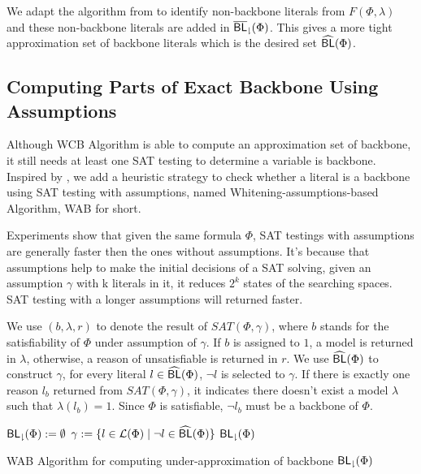 We adapt the algorithm from \cite{Jon75} to identify non-backbone literals from $F(\Phi,\lambda)$ and these non-backbone literals are added in ${\sf \overline{BL}_\downharpoonright}(\Phi)$.
This gives a more tight approximation set of backbone literals which is the desired set ${\sf \widehat{BL}}(\Phi)$.
\fi

\subsection{Computing Parts of Exact Backbone Using Assumptions}

Although WCB Algorithm is able to compute an approximation set of backbone, it still needs at least one SAT testing to determine a variable is backbone. Inspired by \cite{JLM15}, we add a heuristic strategy to check whether a literal is a backbone using SAT testing with assumptions, named Whitening-assumptions-based Algorithm, WAB for short.

Experiments show that given the same formula $\Phi$, SAT testings with assumptions are generally faster then the ones without assumptions. It's because that assumptions help to make the initial decisions of a SAT solving, given an assumption $\gamma$ with k literals in it, it reduces $2^k$ states of the searching spaces. SAT testing with a longer assumptions will returned faster.

We use $(b, \lambda, r)$ to denote the result of $SAT(\Phi,\gamma)$, where $b$ stands for the satisfiability of $\Phi$ under assumption of $\gamma$. If $b$ is assigned to $1$, a model is returned in $\lambda$, otherwise, a reason of unsatisfiable is returned in $r$. We use ${\sf \widehat{BL}}(\Phi)$ to construct $\gamma$, for every literal $l\in{\sf \widehat{BL}}(\Phi)$, $\neg l$ is selected to $\gamma$.
If there is exactly one reason $l_b$ returned from $SAT(\Phi,\gamma)$, it indicates there doesn't exist a model $\lambda$ such that $\lambda(l_b)=1$. Since $\Phi$ is satisfiable, $\neg l_b$ must be a backbone of $\Phi$.


\begin{algorithm2e}
\SetAlgoShortEnd
\SetFillComment
{}
${\sf {BL}_\downharpoonright}(\Phi):=\emptyset$\;
$\gamma:=\{l\in\Lit(\Phi) \mid \neg l\in\BLap(\Phi)\}$\; \label{alg4:init}
\Return ${\sf {BL}_\downharpoonright}(\Phi)$\;
\caption{WAB Algorithm for computing under-approximation of backbone ${\sf {BL}_\downharpoonright}(\Phi)$}
\label{alg:assum}
\end{algorithm2e}

